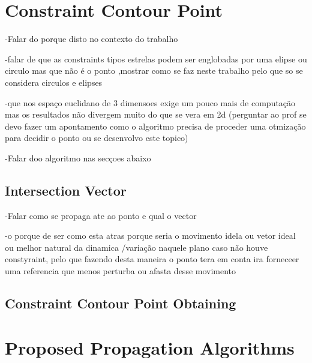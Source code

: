 \newpage %


\section{Constraint Contour Point}
\label{sec:OPtmization_Algorithms}

-Falar do porque disto no contexto do trabalho

-falar de que as constraints tipos estrelas podem ser englobadas por uma elipse ou circulo mas que não é o ponto ,mostrar como se faz neste trabalho pelo que so se considera circulos e elipses

-que nos espaço euclidano de 3 dimensoes exige um pouco mais de computação mas os resultados não divergem muito do que se vera em 2d (perguntar ao prof se devo fazer um apontamento como o algoritmo precisa de proceder uma otmização para decidir o ponto ou se desenvolvo este topico)

-Falar doo algoritmo nas secçoes abaixo


\subsection{Intersection Vector}
\label{subsec:Intersection_Vector}

-Falar como se propaga ate ao ponto e qual o vector

-o porque de ser como esta atras porque seria o movimento idela ou vetor ideal ou melhor natural da dinamica /variação naquele plano caso não houve constyraint, pelo que fazendo desta maneira o ponto tera em conta ira forneceer uma referencia que menos perturba ou afasta desse movimento

\subsection{Constraint Contour Point Obtaining}
\label{subsec:Constraint_Contour_Point_Obtaining}

\newpage %


\section{Proposed Propagation Algorithms}
\label{sec:Proposed_Propagation_Algorithms}

\subsection{}
\label{subsec:Just_Optimized_Algorithm}

